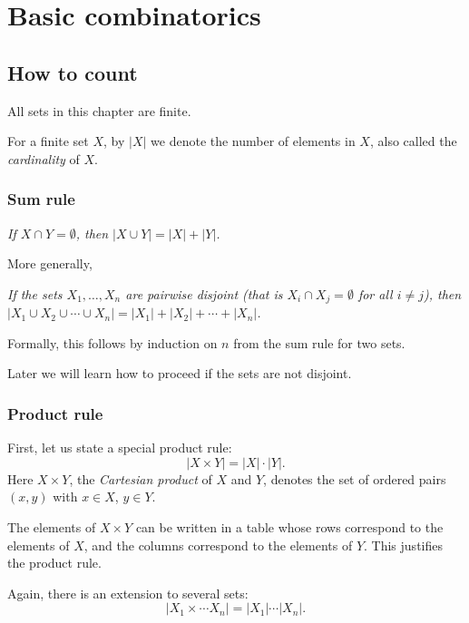 \chapter{Basic combinatorics}

\section{How to count}
All sets in this chapter are finite.

For a finite set $X$, by $|X|$ we denote the number of elements in $X$, also called the \emph{cardinality} of $X$.

\subsection{Sum rule}
\begin{center}
\emph{If $X \cap Y = \emptyset$, then $|X \cup Y| = |X| + |Y|$.}
\end{center}

More generally,
\begin{center}
\parbox{.9\textwidth}{\emph{If the sets $X_1, \ldots, X_n$ are pairwise disjoint
(that is $X_i \cap X_j = \emptyset$ for all $i \ne j$),
then $|X_1 \cup X_2 \cup \cdots \cup X_n| = |X_1| + |X_2| + \cdots + |X_n|$.}}
\end{center}
Formally, this follows by induction on $n$ from the sum rule for two sets.

Later we will learn how to proceed if the sets are not disjoint.

\subsection{Product rule}
First, let us state a special product rule:
\[
|X \times Y| = |X| \cdot |Y|.
\]
Here $X \times Y$, the \emph{Cartesian product} of $X$ and $Y$, denotes the set of ordered pairs $(x,y)$ with $x \in X$, $y \in Y$.

The elements of $X \times Y$ can be written in a table whose rows correspond to the elements of $X$,
and the columns correspond to the elements of $Y$.
This justifies the product rule.

Again, there is an extension to several sets:
\[
|X_1 \times \cdots X_n| = |X_1| \cdots |X_n|.
\]
